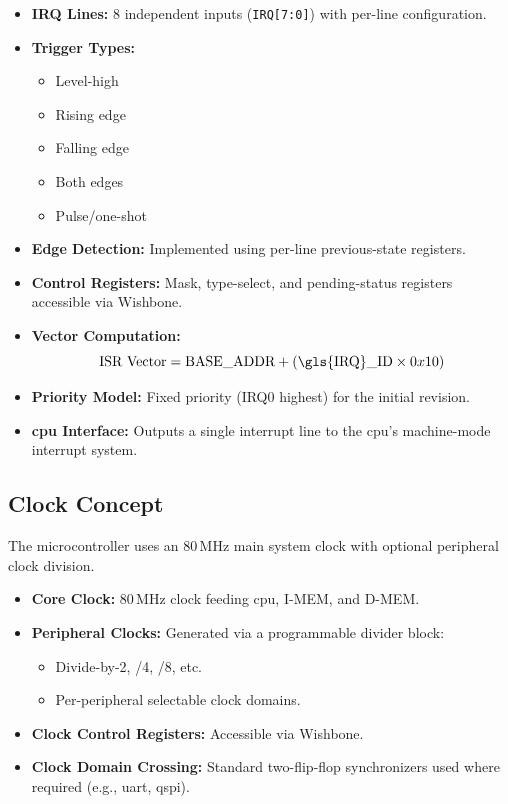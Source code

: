\begin{itemize}
    \item \textbf{\gls{IRQ} Lines:} 8 independent inputs (\texttt{\gls{IRQ}[7:0]}) with per-line configuration.
    \item \textbf{Trigger Types:}
        \begin{itemize}
            \item Level-high
            \item Rising edge
            \item Falling edge
            \item Both edges
            \item Pulse/one-shot
        \end{itemize}
    \item \textbf{Edge Detection:} Implemented using per-line previous-state registers.
    \item \textbf{Control Registers:} 
          Mask, type-select, and pending-status registers accessible via Wishbone.
    \item \textbf{Vector Computation:}
          \[
              \text{ISR Vector} = \text{BASE\_ADDR} + (\text{\gls{IRQ}\_ID} \times 0x10)
          \]
    \item \textbf{Priority Model:} Fixed priority (IRQ0 highest) for the initial revision.
    \item \textbf{\gls{cpu} Interface:} Outputs a single interrupt line to the \gls{cpu}'s machine-mode interrupt system.
\end{itemize}

\subsection{Clock Concept}
The microcontroller uses an 80\,MHz main system clock with optional peripheral clock division.

\begin{itemize}
    \item \textbf{Core Clock:} 80\,MHz clock feeding \gls{cpu}, \gls{I-MEM}, and \gls{D-MEM}.
    \item \textbf{Peripheral Clocks:} Generated via a programmable divider block:
          \begin{itemize}
              \item Divide-by-2, /4, /8, etc.
              \item Per-peripheral selectable clock domains.
          \end{itemize}
    \item \textbf{Clock Control Registers:} Accessible via Wishbone.
    \item \textbf{Clock Domain Crossing:} 
          Standard two-flip-flop synchronizers used where required (e.g., \gls{uart}, \gls{qspi}).
\end{itemize}

